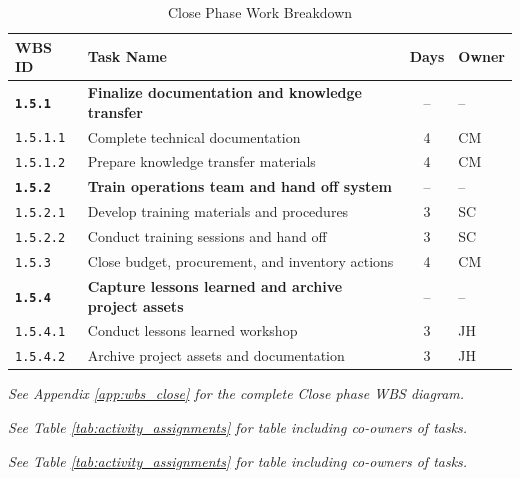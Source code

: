 \begin{table}[H]
\centering
\small
\begin{tabular}{|l|p{6.5cm}|c|l|}
\hline
\rowcolor{closepink!40}
\textbf{WBS ID} & \textbf{Task Name} & \textbf{Days} & \textbf{Owner} \\
\hline
\rowcolor{closepink!35}
\texttt{\textbf{1.5.1}} & \textbf{Finalize documentation and knowledge transfer} & -- & -- \\
\hline
\rowcolor{white}
\texttt{1.5.1.1} & \quad Complete technical documentation & 4 & CM \\
\hline
\rowcolor{closepink!15}
\texttt{1.5.1.2} & \quad Prepare knowledge transfer materials & 4 & CM \\
\hline
\rowcolor{closepink!35}
\texttt{\textbf{1.5.2}} & \textbf{Train operations team and hand off system} & -- & -- \\
\hline
\rowcolor{white}
\texttt{1.5.2.1} & \quad Develop training materials and procedures & 3 & SC \\
\hline
\rowcolor{closepink!15}
\texttt{1.5.2.2} & \quad Conduct training sessions and hand off & 3 & SC \\
\hline
\rowcolor{white}
\texttt{1.5.3} & Close budget, procurement, and inventory actions & 4 & CM \\
\hline
\rowcolor{closepink!35}
\texttt{\textbf{1.5.4}} & \textbf{Capture lessons learned and archive project assets} & -- & -- \\
\hline
\rowcolor{closepink!15}
\texttt{1.5.4.1} & \quad Conduct lessons learned workshop & 3 & JH \\
\hline
\rowcolor{white}
\texttt{1.5.4.2} & \quad Archive project assets and documentation & 3 & JH \\
\hline
\end{tabular}
\caption{Close Phase Work Breakdown}
\label{tab:wbs_close}
\end{table}

\noindent\textit{See Appendix \ref{app:wbs_close} for the complete Close phase WBS diagram.}

\noindent\textit{See Table \ref{tab:activity_assignments} for table including co-owners of tasks.}

\noindent\textit{See Table \ref{tab:activity_assignments} for table including co-owners of tasks.}
